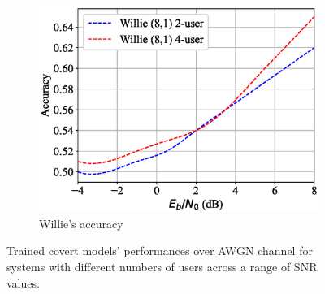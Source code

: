 \begin{figure}[tp!]
\begin{subfigure}{0.28\textwidth}
		\includegraphics[width=\linewidth]{figs/multi_willie_accuracy_awgn}
		\caption{Willie's accuracy}	
		\label{fig:multi_awgn_results_willie}
	\end{subfigure}
	\caption{Trained covert models' performances over AWGN channel for systems with different numbers of users across a range of SNR values.}
	\label{fig:multi_awgn_results}
\end{figure}
